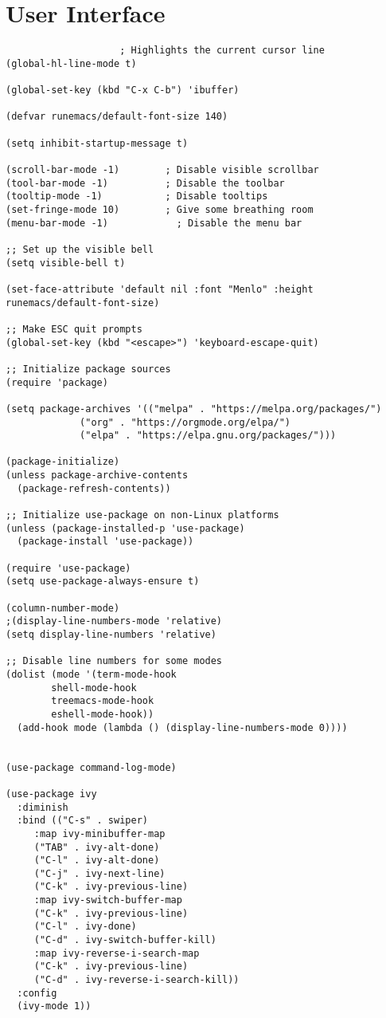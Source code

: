 \documentclass[11pt]{article}
\begin{document}
\section{User Interface}
\label{sec:orgfbdb03c}
\begin{verbatim}
					; Highlights the current cursor line
(global-hl-line-mode t)

(global-set-key (kbd "C-x C-b") 'ibuffer)

(defvar runemacs/default-font-size 140)

(setq inhibit-startup-message t)

(scroll-bar-mode -1)        ; Disable visible scrollbar
(tool-bar-mode -1)          ; Disable the toolbar
(tooltip-mode -1)           ; Disable tooltips
(set-fringe-mode 10)        ; Give some breathing room
(menu-bar-mode -1)            ; Disable the menu bar

;; Set up the visible bell
(setq visible-bell t)

(set-face-attribute 'default nil :font "Menlo" :height runemacs/default-font-size)

;; Make ESC quit prompts
(global-set-key (kbd "<escape>") 'keyboard-escape-quit)

;; Initialize package sources
(require 'package)

(setq package-archives '(("melpa" . "https://melpa.org/packages/")
			 ("org" . "https://orgmode.org/elpa/")
			 ("elpa" . "https://elpa.gnu.org/packages/")))

(package-initialize)
(unless package-archive-contents
  (package-refresh-contents))

;; Initialize use-package on non-Linux platforms
(unless (package-installed-p 'use-package)
  (package-install 'use-package))

(require 'use-package)
(setq use-package-always-ensure t)

(column-number-mode)
;(display-line-numbers-mode 'relative)
(setq display-line-numbers 'relative)

;; Disable line numbers for some modes
(dolist (mode '(term-mode-hook
		shell-mode-hook
		treemacs-mode-hook
		eshell-mode-hook))
  (add-hook mode (lambda () (display-line-numbers-mode 0))))


(use-package command-log-mode)

(use-package ivy
  :diminish
  :bind (("C-s" . swiper)
	 :map ivy-minibuffer-map
	 ("TAB" . ivy-alt-done)
	 ("C-l" . ivy-alt-done)
	 ("C-j" . ivy-next-line)
	 ("C-k" . ivy-previous-line)
	 :map ivy-switch-buffer-map
	 ("C-k" . ivy-previous-line)
	 ("C-l" . ivy-done)
	 ("C-d" . ivy-switch-buffer-kill)
	 :map ivy-reverse-i-search-map
	 ("C-k" . ivy-previous-line)
	 ("C-d" . ivy-reverse-i-search-kill))
  :config
  (ivy-mode 1))


\end{verbatim}
\end{document}
